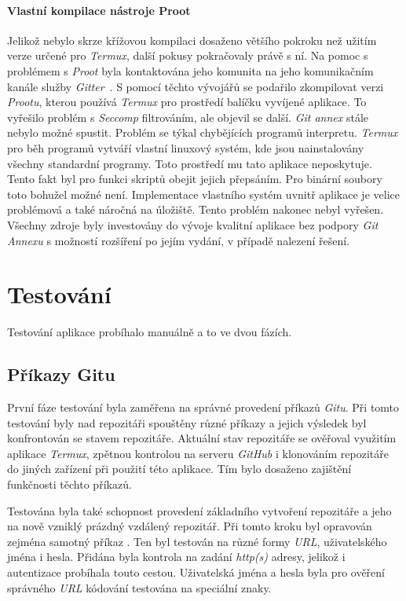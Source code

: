     \subsubsection{Vlastní kompilace nástroje Proot}
    Jelikož nebylo skrze křížovou kompilaci dosaženo většího pokroku než užitím verze určené pro \emph{Termux}, další pokusy pokračovaly právě s ní. Na pomoc s problémem s \emph{Proot} byla kontaktována jeho komunita na jeho komunikačním kanále služby \emph{Gitter}~. S pomocí těchto vývojářů se podařilo zkompilovat verzi \emph{Prootu}, kterou používá \emph{Termux} pro prostředí balíčku vyvíjené aplikace. To vyřešilo problém s \emph{Seccomp} filtrováním, ale objevil se další. \emph{Git annex} stále nebylo možné spustit. Problém se týkal chybějících programů interpretu. \emph{Termux} pro běh programů vytváří vlastní linuxový systém, kde jsou nainstalovány všechny standardní programy. Toto prostředí mu tato aplikace neposkytuje. Tento fakt byl pro funkci skriptů obejit jejich přepsáním. Pro binární soubory toto bohužel možné není. Implementace vlastního systém uvnitř aplikace je velice problémová a také náročná na úložiště. Tento problém nakonec nebyl vyřešen. Všechny zdroje byly investovány do vývoje kvalitní aplikace bez podpory \emph{Git Annexu} s možností rozšíření po jejím vydání, v případě nalezení řešení.

\chapter{Testování}
Testování aplikace probíhalo manuálně a to ve dvou fázích.
\section{Příkazy Gitu}
První fáze testování byla zaměřena na správné provedení příkazů \emph{Gitu}. Při tomto testování byly nad repozitáři spouštěny různé příkazy a jejich výsledek byl konfrontován se stavem repozitáře. Aktuální stav repozitáře se ověřoval využitím aplikace \emph{Termux}, zpětnou kontrolou na serveru \emph{GitHub} i klonováním repozitáře do jiných zařízení při použití této aplikace. Tím bylo dosaženo zajištění funkčnosti těchto příkazů.

Testována byla také schopnost provedení základního vytvoření repozitáře a jeho  na nově vzniklý prázdný vzdálený repozitář. Při tomto kroku byl opravován zejména samotný příkaz . Ten byl testován na různé formy \emph{URL}, uživatelského jména i hesla. Přidána byla kontrola na zadání \emph{http(s)} adresy, jelikož i autentizace probíhala touto cestou. Uživatelská jména a hesla byla pro ověření správného \emph{URL} kódování testována na speciální znaky.

